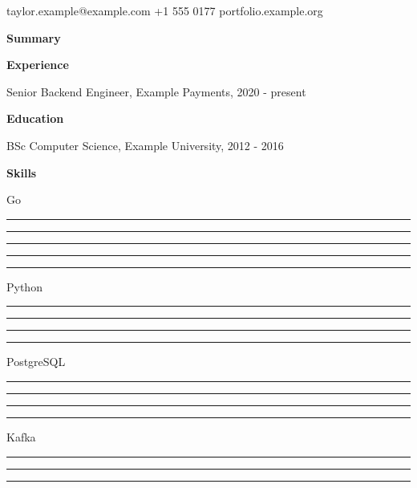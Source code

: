\documentclass[10pt]{article}
\newcommand{\lvl}{\rule{6pt}{6pt}\hspace{3pt}}
\begin{document}
{\LARGE \Person}\par taylor.example@example.com \quad +1 555 0177 \quad portfolio.example.org\par\bigskip
\textbf{Summary}\par \Summary\par\medskip
\textbf{Experience}\par Senior Backend Engineer, Example Payments, 2020 - present\par
\JobA\par \JobB\par\medskip
\textbf{Education}\par BSc Computer Science, Example University, 2012 - 2016\par\medskip
\textbf{Skills}\par
Go \hspace{2cm} \lvl\lvl\lvl\lvl\lvl\par
Python \hspace{2cm} \lvl\lvl\lvl\lvl\par
PostgreSQL \hspace{2cm} \lvl\lvl\lvl\lvl\par
Kafka \hspace{2cm} \lvl\lvl\lvl\par
\end{document}

